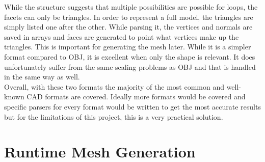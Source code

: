 While the structure suggests that multiple possibilities are possible for loops, the facets can only be triangles. In order to represent a full model, the triangles are simply listed one after the other. While parsing it, the vertices and normals are saved in arrays and faces are generated to point what vertices make up the triangles. This is important for generating the mesh later. While it is a simpler format compared to OBJ, it is excellent when only the shape is relevant. It does unfortunately suffer from the same scaling problems as OBJ and that is handled in the same way as well.\\
Overall, with these two formats the majority of the most common and well-known \acs{CAD} formats are covered. Ideally more formats would be covered and specific parsers for every format would be written to get the most accurate results but for the limitations of this project, this is a very practical solution.

\section{Runtime Mesh Generation}

